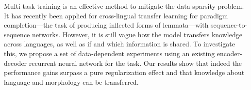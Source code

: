 Multi-task training is an effective method to mitigate the data sparsity problem. It has recently been applied for cross-lingual transfer learning for paradigm completion---the task of producing inflected forms of lemmata---with sequence-to-sequence networks. However, it is still vague how the model transfers knowledge across languages, as well as if and which information is shared. To investigate this, we propose a set of data-dependent experiments using an existing encoder-decoder recurrent neural network for the task. Our results show that indeed the performance gains surpass a pure regularization effect and that knowledge about language and morphology can be transferred.
